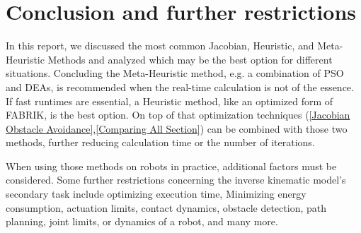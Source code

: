 \documentclass[conference]{IEEEtran}
\begin{document}
\section{Conclusion and further restrictions}
In this report, we discussed the most common Jacobian, Heuristic, and Meta-Heuristic Methods and analyzed which may be the best option for different situations. Concluding the Meta-Heuristic method, e.g. a combination of PSO and DEAs, is recommended when the real-time calculation is not of the essence. If fast runtimes are essential, a Heuristic method, like an optimized form of FABRIK, is the best option. On top of that optimization techniques (\ref{Jacobian Obstacle Avoidance},\ref{Comparing All Section}) can be combined with those two methods, further reducing calculation time or the number of iterations.

When using those methods on robots in practice, additional factors must be considered. Some further restrictions concerning the inverse kinematic model's secondary task include optimizing execution time, Minimizing energy consumption, actuation limits, contact dynamics, obstacle detection, path planning, joint limits, or dynamics of a robot, and many more.






%


\end{document}
